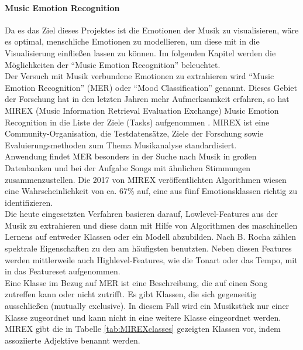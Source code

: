 \documentclass[11pt,a4paper]{article}
\begin{document}
\paragraph{Music Emotion Recognition}
Da es das Ziel dieses Projektes ist die Emotionen der Musik zu visualisieren, wäre es optimal, menschliche Emotionen zu modellieren, um diese mit in die Visualisierung einfließen lassen zu können. Im folgenden Kapitel werden die Möglichkeiten der ``Music Emotion Recognition'' beleuchtet.\\
Der Versuch mit Musik verbundene Emotionen zu extrahieren wird ``Music Emotion Recognition'' (MER) oder ``Mood Classification'' genannt. Dieses Gebiet der Forschung hat in den letzten Jahren mehr Aufmerksamkeit erfahren, so hat MIREX (Music Information Retrieval Evaluation Exchange) Music Emotion Recognition in die Liste der Ziele (Tasks) aufgenommen \cite{dadf933477b66ec1591840023fc37ac83b3e10d5aa4fd440639abca907d805ba}. MIREX ist eine Community-Organisation, die Testdatensätze, Ziele der Forschung sowie Evaluierungsmethoden zum Thema Musikanalyse standardisiert.\\
Anwendung findet MER besonders in der Suche nach Musik in großen Datenbanken und bei der Aufgabe Songs mit ähnlichen Stimmungen zusammenzustellen. Die 2017 von MIREX veröffentlichten Algorithmen wiesen eine Wahrscheinlichkeit von ca. 67\% auf, eine aus fünf Emotionsklassen richtig zu identifizieren\cite{mirex_results_2017}.\\
Die heute eingesetzten Verfahren basieren darauf, Lowlevel-Features aus der Musik zu extrahieren und diese dann mit Hilfe von Algorithmen des maschinellen Lernens auf entweder Klassen oder ein Modell abzubilden. Nach B. Rocha \cite[S. 2]{43334da08db3748e0a566e71fbb76d92cf6f15f35575908aa975b0b2baddab5b} zählen spektrale Eigenschaften zu den am häufigsten benutzten. Neben diesen Features werden mittlerweile auch Highlevel-Features, wie die Tonart oder das Tempo, mit in das Featureset aufgenommen.\\
Eine Klasse im Bezug auf MER ist eine Beschreibung, die auf einen Song zutreffen kann oder nicht zutrifft. Es gibt Klassen, die sich gegenseitig ausschließen (mutually exclusive). In diesem Fall wird ein Musikstück nur einer Klasse zugeordnet und kann nicht in eine weitere Klasse eingeordnet werden.\\
MIREX gibt die in Tabelle \ref{tab:MIREXclasses} gezeigten Klassen vor, indem assoziierte Adjektive benannt werden.
\end{document}
